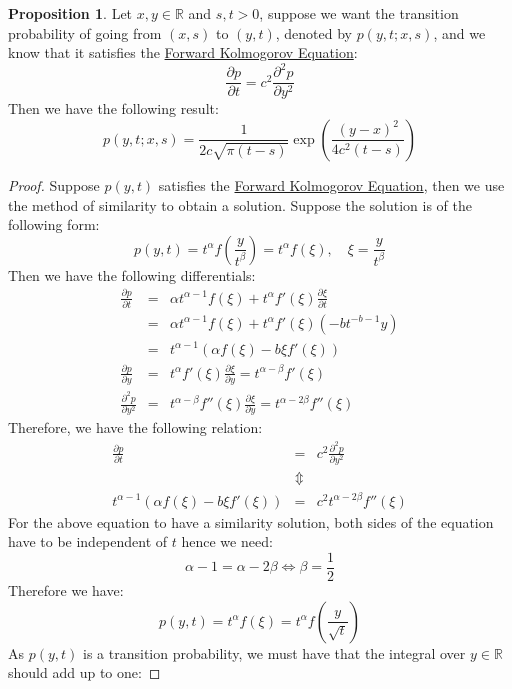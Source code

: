 \documentclass[11pt]{article}
\theoremstyle{definition}
\newtheorem{prop}{Proposition}[section]
\newcommand{\brac}[1]{\left(#1\right)}
\newcommand{\pardiff}[2]{\frac{\partial #1}{\partial #2}}
\newcommand{\R}{\mathbb{R}}
\begin{document}
	\begin{prop}\label{forwardKolmogorovSolnProp}
		Let $x,y\in\R$ and $s,t>0$, suppose we want the transition probability of going from $\brac{x,s}$ to $\brac{y,t}$, denoted by $p\brac{y,t;x,s}$, and we know that it satisfies the \hyperref[forwardKolmogorovEqn]{Forward Kolmogorov Equation}:
		$$\pardiff{p}{t}= c^2 \pardiff{^2p}{y^2}$$
		Then we have the following result:
		\begin{equation}\label{forwardKolmogorovSoln}
			p\brac{y,t;x,s} = \frac{1}{2c\sqrt{\pi\brac{t-s}}}\exp\brac{\frac{\brac{y-x}^2}{4c^2\brac{t-s}}}
		\end{equation}
	\end{prop}
	\begin{proof}
		Suppose $p\brac{y,t}$ satisfies the \hyperref[forwardKolmogorovEqn]{Forward Kolmogorov Equation}, then we use the method of similarity to obtain a solution. Suppose the solution is of the following form:
		$$p\brac{y,t} = t^\alpha f\brac{\frac{y}{t^\beta}} = t^\alpha f\brac{\xi},\quad \xi = \frac{y}{t^\beta} $$
		Then we have the following differentials:
		\begin{eqnarray*}
			\pardiff{p}{t} &=& \alpha t^{\alpha -1}f\brac{\xi} + t^\alpha f'\brac{\xi}\pardiff{\xi}{t}\\
			&=& \alpha t^{\alpha -1}f\brac{\xi} + t^\alpha f'\brac{\xi}\brac{ -bt^{-b-1}y}\\
			&=& t^{\alpha -1}\brac{\alpha f\brac{\xi} -b\xi f'\brac{\xi}}\\
			\pardiff{p}{y} &=& t^\alpha f'\brac{\xi}\pardiff{\xi}{y} = t^{\alpha-\beta} f'\brac{\xi}\\
			\pardiff{^2p}{y^2} &=& t^{\alpha-\beta} f''\brac{\xi}\pardiff{\xi}{y} = t^{\alpha-2\beta} f''\brac{\xi}
		\end{eqnarray*}
		Therefore, we have the following relation:
		\begin{eqnarray*}
			\pardiff{p}{t} &=& c^2 \pardiff{^2p}{y^2}\\
			&\Updownarrow& \\
			t^{\alpha -1}\brac{\alpha f\brac{\xi} -b\xi f'\brac{\xi}} &=& c^2t^{\alpha-2\beta} f''\brac{\xi}
		\end{eqnarray*}
		For the above equation to have a similarity solution, both sides of the equation have to be independent of $t$ hence we need:
		$$\alpha -1 = \alpha - 2\beta \Leftrightarrow \beta = \frac{1}{2}$$
		Therefore we have:
		$$p\brac{y,t} = t^\alpha f\brac{\xi} = t^\alpha f\brac{\frac{y}{\sqrt{t}}}$$
		As $p\brac{y,t}$ is a transition probability, we must have that the integral over $y\in\R$ should add up to one:

\end{proof}
\end{document}
